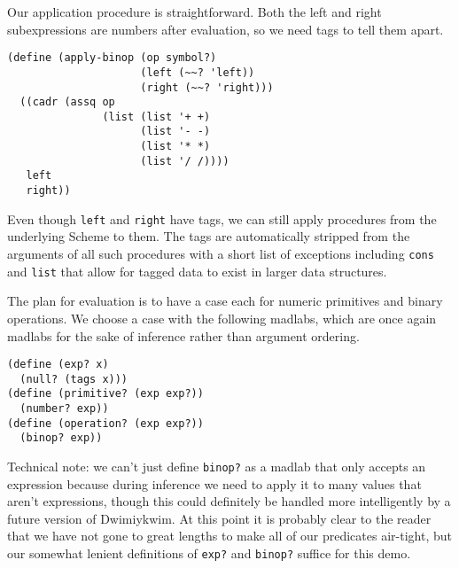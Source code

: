 \documentclass[11pt]{article}
\begin{document}
Our application procedure is straightforward.
Both the left and right subexpressions are numbers after evaluation,
so we need tags to tell them apart.
\begin{Verbatim}
(define (apply-binop (op symbol?)
                     (left (~~? 'left))
                     (right (~~? 'right)))
  ((cadr (assq op
               (list (list '+ +)
                     (list '- -)
                     (list '* *)
                     (list '/ /))))
   left
   right))
\end{Verbatim}
Even though \texttt{left} and \texttt{right} have tags,
we can still apply procedures from the underlying Scheme to them.
The tags are automatically stripped from the arguments of all such procedures
with a short list of exceptions including \texttt{cons} and \texttt{list}
that allow for tagged data to exist in larger data structures.

The plan for evaluation is to have a case each
for numeric primitives and binary operations.
We choose a case with the following madlabs,
which are once again madlabs for the sake of inference
rather than argument ordering.
\begin{Verbatim}
(define (exp? x)
  (null? (tags x)))
(define (primitive? (exp exp?))
  (number? exp))
(define (operation? (exp exp?))
  (binop? exp))
\end{Verbatim}
Technical note: we can't just define \texttt{binop?} as a madlab
that only accepts an expression
because during inference we need to apply it
to many values that aren't expressions,
though this could definitely be handled more intelligently
by a future version of Dwimiykwim.
At this point it is probably clear to the reader that
we have not gone to great lengths to make all of our predicates air-tight,
but our somewhat lenient definitions of \texttt{exp?} and \texttt{binop?}
suffice for this demo.
\end{document}
